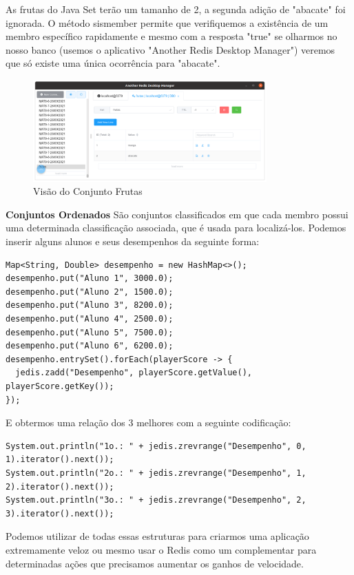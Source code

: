 As frutas do Java Set terão um tamanho de 2, a segunda adição de "abacate" foi ignorada. O método sismember permite que verifiquemos a existência de um membro específico rapidamente e mesmo com a resposta "true" se olharmos no nosso banco (usemos o aplicativo "Another Redis Desktop Manager") veremos que só existe uma única ocorrência para "abacate".
\begin{figure}[H]
	\centering
	\includegraphics[width=0.8\textwidth]{imagens/frutas}
	\caption{Visão do Conjunto Frutas}
\end{figure}

\textbf{Conjuntos Ordenados}
São conjuntos classificados em que cada membro possui uma determinada classificação associada, que é usada para localizá-los. Podemos inserir alguns alunos e seus desempenhos da seguinte forma:
\begin{lstlisting}[]
Map<String, Double> desempenho = new HashMap<>();
desempenho.put("Aluno 1", 3000.0);
desempenho.put("Aluno 2", 1500.0);
desempenho.put("Aluno 3", 8200.0);
desempenho.put("Aluno 4", 2500.0);
desempenho.put("Aluno 5", 7500.0);
desempenho.put("Aluno 6", 6200.0);
desempenho.entrySet().forEach(playerScore -> {
  jedis.zadd("Desempenho", playerScore.getValue(), playerScore.getKey());
});	
\end{lstlisting}

E obtermos uma relação dos 3 melhores com a seguinte codificação:
\begin{lstlisting}[]
System.out.println("1o.: " + jedis.zrevrange("Desempenho", 0, 1).iterator().next());
System.out.println("2o.: " + jedis.zrevrange("Desempenho", 1, 2).iterator().next());
System.out.println("3o.: " + jedis.zrevrange("Desempenho", 2, 3).iterator().next());
\end{lstlisting}

Podemos utilizar de todas essas estruturas para criarmos uma aplicação extremamente veloz ou mesmo usar o Redis como um complementar para determinadas ações que precisamos aumentar os ganhos de velocidade.
